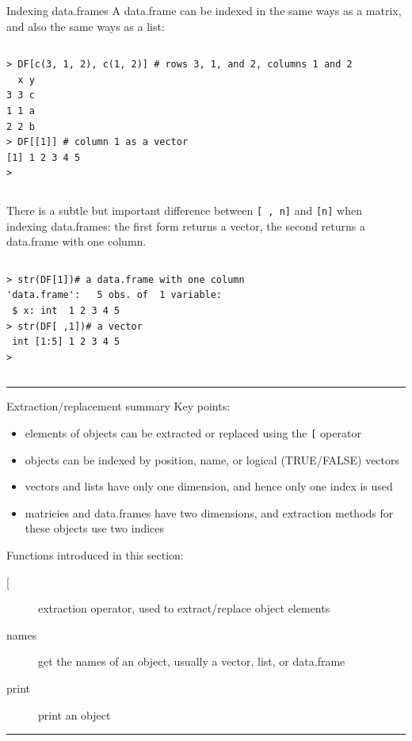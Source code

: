 \documentclass[table,smaller]{beamer}
\begin{document}
\begin{frame}[fragile,label=sec-3-5]{Indexing data.frames}
 A data.frame can be indexed in the same ways as a matrix, and also the same ways as a list:

\vspace{-.5em}
\begin{columns}
\begin{block}{}
\begin{verbatim}
> DF[c(3, 1, 2), c(1, 2)] # rows 3, 1, and 2, columns 1 and 2
  x y
3 3 c
1 1 a
2 2 b
> DF[[1]] # column 1 as a vector
[1] 1 2 3 4 5
>
\end{verbatim}
\end{block}
\end{columns}
\vspace{.5em}

There is a subtle but important difference between \texttt{[ , n]} and \texttt{[n]} when indexing data.frames: the first form returns a vector, the second returns a data.frame with one column.
\vspace{-.5em}
\begin{columns}
\begin{block}{}
\begin{verbatim}
> str(DF[1])# a data.frame with one column
'data.frame':	5 obs. of  1 variable:
 $ x: int  1 2 3 4 5
> str(DF[ ,1])# a vector
 int [1:5] 1 2 3 4 5
>
\end{verbatim}
\end{block}
\end{columns}
\vspace{.5em}

\rule{\linewidth}{0.5pt}
\end{frame}
\begin{frame}[fragile,label=sec-3-6]{Extraction/replacement summary}
 Key points:

\begin{itemize}
\item elements of objects can be extracted or replaced using the \texttt{[} operator
\item objects can be indexed by position, name, or logical (TRUE/FALSE) vectors
\item vectors and lists have only one dimension, and hence only one index is used
\item matricies and data.frames have two dimensions, and extraction methods for these objects use two indices
\end{itemize}
Functions introduced in this section: 
\begin{description}
\item[{[}] extraction operator, used to extract/replace object elements
\item[{names}] get the names of an object, usually a vector, list, or data.frame
\item[{print}] print an object
\end{description}

\rule{\linewidth}{0.5pt}
\end{frame}
\end{document}
